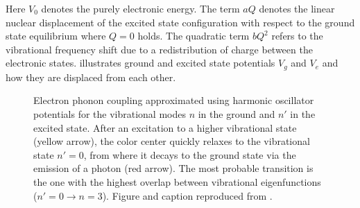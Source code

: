     Here $V_0$ denotes the purely electronic energy. The term $aQ$ denotes the linear nuclear displacement of the excited state configuration with respect to the ground state equilibrium where $Q = 0$ holds.
    The quadratic term $b Q^2$ refers to the vibrational frequency shift due to a redistribution of charge between the electronic states.  illustrates ground and excited state potentials $V_g$ and $V_e$ and how they are displaced from each other.

    \begin{figure}[!htb]
     \centering
     \caption[Electron-phonon coupling approximated]{Electron phonon coupling approximated using harmonic oscillator potentials for the vibrational modes $n$ in the ground and $n'$ in the excited state. After an excitation to a higher vibrational state (yellow arrow), the color center quickly relaxes to the vibrational state $n' = 0$, from where it decays to the ground state via the emission of a photon (red arrow). The most probable transition is the one with the highest overlap between vibrational eigenfunctions ($n' = 0 \to n = 3$). Figure and caption reproduced from \cite{Hepp2014dissertation}.}
     \label{fig::harmonic_model}
    \end{figure}


